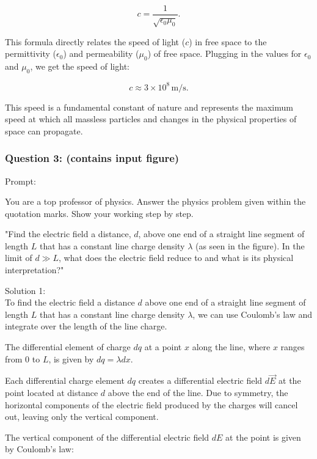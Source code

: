 \documentclass[a4paper,11pt]{article}
\begin{document}
\[
c = \frac{1}{\sqrt{\epsilon_0\mu_0}}.
\]

This formula directly relates the speed of light (\(c\)) in free space to the permittivity (\(\epsilon_0\)) and permeability (\(\mu_0\)) of free space. Plugging in the values for \(\epsilon_0\) and \(\mu_0\), we get the speed of light:

\[
c \approx 3 \times 10^8 \, \text{m/s}.
\]

This speed is a fundamental constant of nature and represents the maximum speed at which all massless particles and changes in the physical properties of space can propagate.


\subsubsection*{Question 3: (contains input figure)}

Prompt:
\begin{spverbatim}
    You are a top professor of physics. Answer the physics problem given within the quotation marks. Show your working step by step.

    "Find the electric field a distance, \( d \), above one end of a straight line segment of length \( L \) that has a constant line charge density \( \lambda \) (as seen in the figure). In the limit of \( d \gg L \), what does the electric field reduce to and what is its physical interpretation?"
\end{spverbatim}

\bigskip

\noindent Solution 1: \\

To find the electric field a distance \( d \) above one end of a straight line segment of length \( L \) that has a constant line charge density \( \lambda \), we can use Coulomb's law and integrate over the length of the line charge.

The differential element of charge \( dq \) at a point \( x \) along the line, where \( x \) ranges from 0 to \( L \), is given by \( dq = \lambda dx \).

Each differential charge element \( dq \) creates a differential electric field \( d\vec{E} \) at the point located at distance \( d \) above the end of the line. Due to symmetry, the horizontal components of the electric field produced by the charges will cancel out, leaving only the vertical component.

The vertical component of the differential electric field \( dE \) at the point is given by Coulomb's law:
\end{document}
